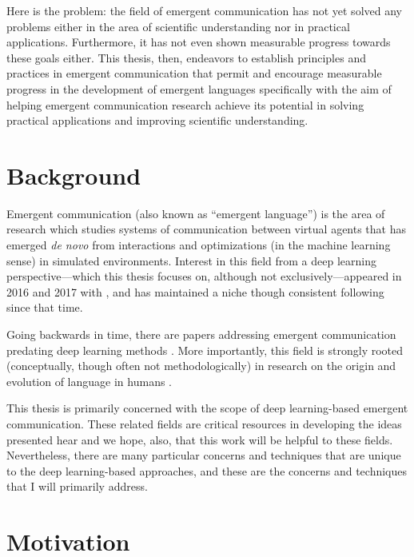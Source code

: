 Here is the problem: the field of emergent communication has not yet solved any problems either in the area of scientific understanding nor in practical applications.
Furthermore, it has not even shown measurable progress towards these goals either.
This thesis, then, endeavors to establish principles and practices in emergent communication that permit and encourage measurable progress in the development of emergent languages specifically with the aim of helping emergent communication research achieve its potential in solving practical applications and improving scientific understanding.

\section{Background}

Emergent communication (also known as ``emergent language'') is the area of research which studies systems of communication between virtual agents that has emerged \emph{de novo} from interactions and optimizations (in the machine learning sense) in simulated environments.
Interest in this field from a deep learning perspective---which this thesis focuses on, although not exclusively---appeared in 2016 and 2017 with , and has maintained a niche though consistent following since that time.

Going backwards in time, there are papers addressing emergent communication predating deep learning methods .
More importantly, this field is strongly rooted (conceptually, though often not methodologically) in research on the origin and evolution of language in humans .

This thesis is primarily concerned with the scope of deep learning-based emergent communication.
These related fields are critical resources in developing the ideas presented hear and we hope, also, that this work will be helpful to these fields.
Nevertheless, there are many particular concerns and techniques that are unique to the deep learning-based approaches, and these are the concerns and techniques that I will primarily address.



\section{Motivation}



